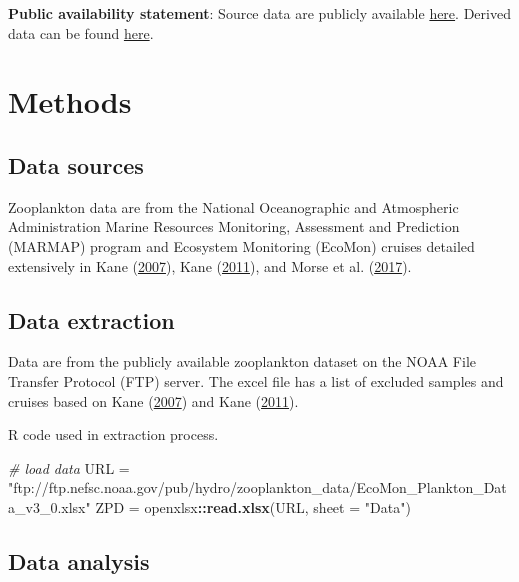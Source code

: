 \documentclass[
]{book}
\newenvironment{Shaded}{\begin{snugshade}}{\end{snugshade}}
\newcommand{\CommentTok}[1]{\textcolor[rgb]{0.56,0.35,0.01}{\textit{#1}}}
\newcommand{\DataTypeTok}[1]{\textcolor[rgb]{0.13,0.29,0.53}{#1}}
\newcommand{\KeywordTok}[1]{\textcolor[rgb]{0.13,0.29,0.53}{\textbf{#1}}}
\newcommand{\NormalTok}[1]{#1}
\newcommand{\OperatorTok}[1]{\textcolor[rgb]{0.81,0.36,0.00}{\textbf{#1}}}
\newcommand{\StringTok}[1]{\textcolor[rgb]{0.31,0.60,0.02}{#1}}
\begin{document}
\textbf{Public availability statement}: Source data are publicly available \href{ftp://ftp.nefsc.noaa.gov/pub/hydro/zooplankton_data/}{here}. Derived data can be found \href{https://comet.nefsc.noaa.gov/erddap/tabledap/zoo_abundance_soe_v1.html}{here}.

\hypertarget{methods-45}{%
\section{Methods}\label{methods-45}}

\hypertarget{data-sources-44}{%
\subsection{Data sources}\label{data-sources-44}}

Zooplankton data are from the National Oceanographic and Atmospheric Administration Marine Resources Monitoring, Assessment and Prediction (MARMAP) program and Ecosystem Monitoring (EcoMon) cruises detailed extensively in Kane (\protect\hyperlink{ref-Kane2007}{2007}), Kane (\protect\hyperlink{ref-Kane2011}{2011}), and Morse et al. (\protect\hyperlink{ref-Morse2017}{2017}).

\hypertarget{data-extraction-36}{%
\subsection{Data extraction}\label{data-extraction-36}}

Data are from the publicly available zooplankton dataset on the NOAA File Transfer Protocol (FTP) server. The excel file has a list of excluded samples and cruises based on Kane (\protect\hyperlink{ref-Kane2007}{2007}) and Kane (\protect\hyperlink{ref-Kane2011}{2011}).

R code used in extraction process.

\begin{Shaded}
\begin{Highlighting}[]
\CommentTok{# load data}
\NormalTok{URL =}\StringTok{ "ftp://ftp.nefsc.noaa.gov/pub/hydro/zooplankton_data/EcoMon_Plankton_Data_v3_0.xlsx"}
\NormalTok{ZPD =}\StringTok{ }\NormalTok{openxlsx}\OperatorTok{::}\KeywordTok{read.xlsx}\NormalTok{(URL, }\DataTypeTok{sheet =} \StringTok{"Data"}\NormalTok{)}
\end{Highlighting}
\end{Shaded}

\hypertarget{data-analysis-43}{%
\subsection{Data analysis}\label{data-analysis-43}}
\end{document}
